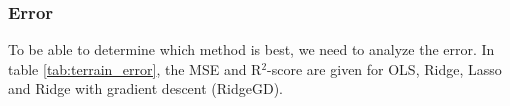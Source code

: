\begin{figure} [H]
	
	\caption{}%
	\label{fig:terrain_plots}%
\end{figure}
\restoregeometry


\subsubsection{Error}
To be able to determine which method is best, we need to analyze the error. In table \eqref{tab:terrain_error}, the MSE and R$^2$-score are given for OLS, Ridge, Lasso and Ridge with gradient descent (RidgeGD). 

